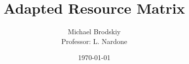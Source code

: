 


\title{Adapted Resource Matrix}
\date{\today}
\author{Michael Brodskiy\\ \small Professor: L. Nardone}



\maketitle

